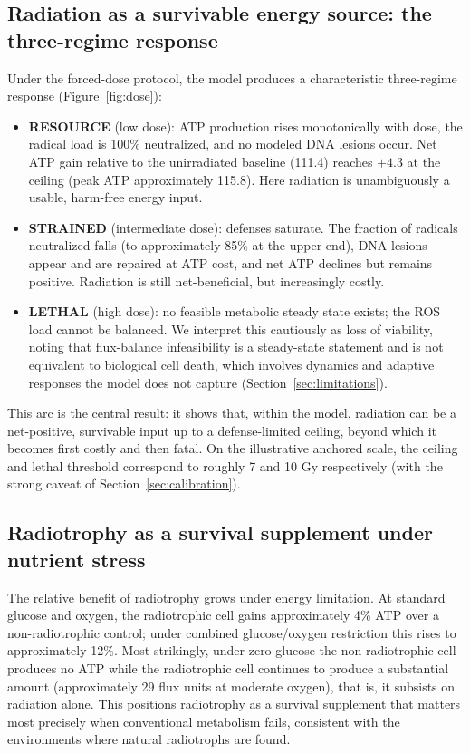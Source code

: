 \documentclass[11pt]{article}
\begin{document}
\subsection{Radiation as a survivable energy source: the three-regime response}

Under the forced-dose protocol, the model produces a characteristic three-regime
response (Figure~\ref{fig:dose}):
\begin{itemize}
  \item \textbf{RESOURCE} (low dose): ATP production rises monotonically with dose,
  the radical load is 100\% neutralized, and no modeled DNA lesions occur. Net ATP gain
  relative to the unirradiated baseline (111.4) reaches $+4.3$ at the ceiling (peak
  ATP approximately 115.8). Here radiation is unambiguously a usable, harm-free
  energy input.
  \item \textbf{STRAINED} (intermediate dose): defenses saturate. The fraction of
  radicals neutralized falls (to approximately 85\% at the upper end), DNA lesions
  appear and are repaired at ATP cost, and net ATP declines but remains positive.
  Radiation is still net-beneficial, but increasingly costly.
  \item \textbf{LETHAL} (high dose): no feasible metabolic steady state exists; the
  ROS load cannot be balanced. We interpret this cautiously as loss of viability,
  noting that flux-balance infeasibility is a steady-state statement and is not
  equivalent to biological cell death, which involves dynamics and adaptive
  responses the model does not capture (Section~\ref{sec:limitations}).
\end{itemize}

This arc is the central result: it shows that, within the model, radiation can be a
net-positive, survivable input up to a defense-limited ceiling, beyond which it
becomes first costly and then fatal. On the illustrative anchored scale, the
ceiling and lethal threshold correspond to roughly 7 and 10 Gy respectively (with
the strong caveat of Section~\ref{sec:calibration}).

\subsection{Radiotrophy as a survival supplement under nutrient stress}

The relative benefit of radiotrophy grows under energy limitation. At standard
glucose and oxygen, the radiotrophic cell gains approximately 4\% ATP over a
non-radiotrophic control; under combined glucose/oxygen restriction this rises to
approximately 12\%. Most strikingly, under zero glucose the non-radiotrophic cell
produces no ATP while the radiotrophic cell continues to produce a substantial
amount (approximately 29 flux units at moderate oxygen), that is, it subsists on
radiation alone. This positions radiotrophy as a survival supplement that matters
most precisely when conventional metabolism fails, consistent with the environments
where natural radiotrophs are found.
\end{document}

